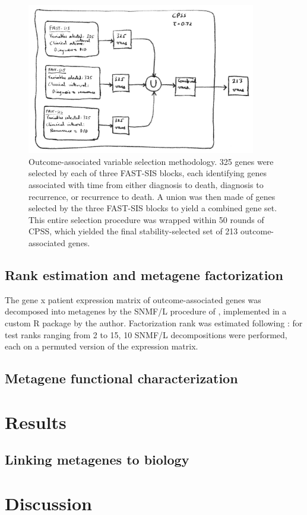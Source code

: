 \documentclass[thesis.tex]{subfiles}
\begin{document}
\begin{figure}
\includegraphics[width=100mm]{resources/surv_varsel.jpg}
\caption{Outcome-associated variable selection methodology.  325 genes were selected by each of three \acrshort{FAST}-\acrshort{SIS} blocks, each identifying genes associated with time from either diagnosis to death, diagnosis to recurrence, or recurrence to death.  A union was then made of genes selected by the three \acrshort{FAST}-\acrshort{SIS} blocks to yield a combined gene set.  This entire selection procedure was wrapped within 50 rounds of \acrshort{CPSS}, which yielded the final stability-selected set of 213 outcome-associated genes.}
\label{fig:surv_varsel}
\end{figure}

\subsection{Rank estimation and metagene factorization}
The gene x patient expression matrix of outcome-associated genes was decomposed into metagenes by the SNMF/L procedure of \cite{Kim2007}, implemented in a custom R package by the author.  Factorization rank was estimated following \cite{Frigyesi2008}: for test ranks ranging from 2 to 15, 10 SNMF/L decompositions were performed, each on a permuted version of the expression matrix.

\subsection{Metagene functional characterization}

\section{Results}
\subsection{}
\subsection{Linking metagenes to biology}

\section{Discussion}



\end{document}
